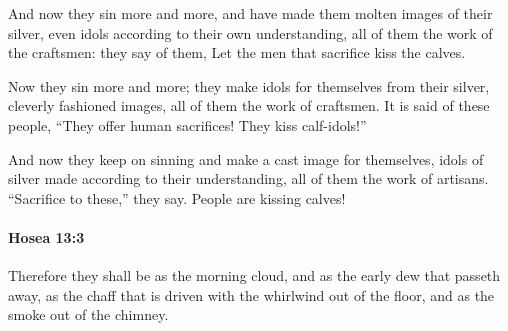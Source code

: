 			\begin{versebox}
					\item[BHS] 
					\item[LXX] 
					\item[ASV] And now they sin more and more, and have made them molten images of their silver, even idols according to their own understanding, all of them the work of the craftsmen: they say of them, Let the men that sacrifice kiss the calves.
					\item[NIV] Now they sin more and more; they make idols for themselves from their silver, cleverly fashioned images, all of them the work of craftsmen. It is said of these people, “They offer human sacrifices! They kiss calf-idols!”
					\item[NRSV] And now they keep on sinning and make a cast image for themselves, idols of silver made according to their understanding, all of them the work of artisans. “Sacrifice to these,” they say. People are kissing calves!
			\end{versebox}

		\paragraph{Hosea 13:3} %
			\label{HOSEA-13-3}

			Therefore they shall be as the morning cloud, and as the early dew that passeth away, as the chaff that is driven with the whirlwind out of the floor, and as the smoke out of the chimney.

